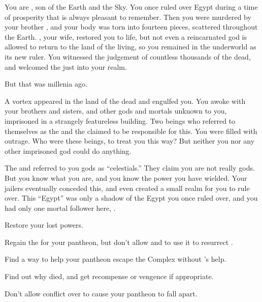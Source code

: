 \documentclass[char]{guardians}
\begin{document}
\name{\cOsiris{}}

You are \cOsiris{}, son of the Earth and the Sky. You once ruled over Egypt during a time of prosperity that is always pleasant to remember. Then you were murdered by your brother \cSet{}, and your body was torn into fourteen pieces, scattered throughout the Earth. \cIsis{}, your wife, restored you to life, but not even a reincarnated god is allowed to return to the land of the living, so you remained in the underworld as its new ruler. You witnessed the judgement of countless thousands of the dead, and welcomed the just into your realm.

But that was millenia ago.

A vortex appeared in the land of the dead and engulfed you. You awoke with your brothers and sisters, and other gods and mortals unknown to you, imprisoned in a strangely featureless building. Two beings who referred to themselves as the \cCaretaker{} and the \cWarden{} claimed to be responsible for this. You were filled with outrage. Who were these beings, to treat you this way? But neither you nor any other imprisoned god could do anything.

The \cCaretaker{} and \cWarden{} referred to you gods as ``celestials.'' They claim you are not really gods. But you know what you are, and you know the power you have wielded. Your jailers eventually conceded this, and even created a small realm for you to rule over. This ``Egypt'' was only a shadow of the Egypt you once ruled over, and you had only one mortal follower here, \cEgyptianHuman{}.


\begin{itemz}[Goals]
  \item Restore your lost powers.
  \item Regain the \iNecro{} for your pantheon, but don't allow \cIsis{} and \cAnubis{} to use it to resurrect \cSet{}.
  \item Find a way to help your pantheon escape the Complex without \cSet{}'s help.
  \item Find out why \cEgyptianHuman{} died, and get recompense or vengence if appropriate.
  \item Don't allow conflict over \cEgyptianHuman{} to cause your pantheon to fall apart.
\end{itemz}

\begin{contacts}
  \contact{\cIsis{}}
  \contact{\cAnubis{}}
  \contact{\cHel{}}
  \contact{\cCaretaker{}}
  \contact{\cWarden{}}
\end{contacts}
\end{document}
